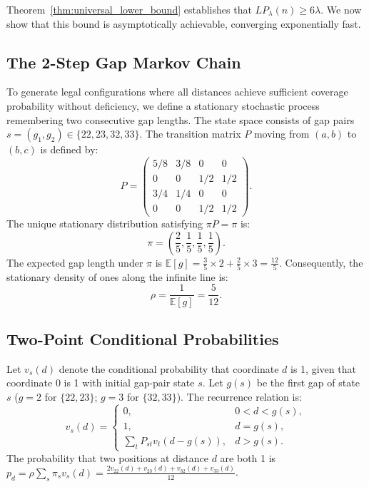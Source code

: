 \documentclass[11pt,a4paper]{article}
\theoremstyle{definition}
\theoremstyle{remark}
\begin{document}
Theorem~\ref{thm:universal_lower_bound} establishes that $LP_\lambda(n) \ge 6\lambda$. We now show that this bound is asymptotically achievable, converging exponentially fast.

\subsection{The 2-Step Gap Markov Chain}

To generate legal configurations where all distances achieve sufficient coverage probability without deficiency, we define a stationary stochastic process remembering two consecutive gap lengths.
The state space consists of gap pairs $s = (g_1, g_2) \in \{22, 23, 32, 33\}$. The transition matrix $P$ moving from $(a, b)$ to $(b, c)$ is defined by:
\begin{equation}
    P = \begin{pmatrix}
        5/8 & 3/8 & 0 & 0 \\
        0 & 0 & 1/2 & 1/2 \\
        3/4 & 1/4 & 0 & 0 \\
        0 & 0 & 1/2 & 1/2
    \end{pmatrix}.
\end{equation}
The unique stationary distribution satisfying $\pi P = \pi$ is:
\begin{equation}
    \pi = \left(\frac{2}{5}, \frac{1}{5}, \frac{1}{5}, \frac{1}{5}\right).
\end{equation}
The expected gap length under $\pi$ is $\mathbb{E}[g] = \frac{3}{5} \times 2 + \frac{2}{5} \times 3 = \frac{12}{5}$.
Consequently, the stationary density of ones along the infinite line is:
\begin{equation}
    \rho = \frac{1}{\mathbb{E}[g]} = \frac{5}{12}.
\end{equation}

\subsection{Two-Point Conditional Probabilities}

Let $v_s(d)$ denote the conditional probability that coordinate $d$ is 1, given that coordinate 0 is 1 with initial gap-pair state $s$. Let $g(s)$ be the first gap of state $s$ ($g=2$ for $\{22, 23\}$; $g=3$ for $\{32, 33\}$). The recurrence relation is:
\begin{equation}
    v_s(d) = \begin{cases}
        0, & 0 < d < g(s), \\
        1, & d = g(s), \\
        \sum_t P_{st} v_t(d - g(s)), & d > g(s).
    \end{cases}
\end{equation}
The probability that two positions at distance $d$ are both 1 is $p_d = \rho \sum_s \pi_s v_s(d) = \frac{2v_{22}(d) + v_{23}(d) + v_{32}(d) + v_{33}(d)}{12}$.
\end{document}
